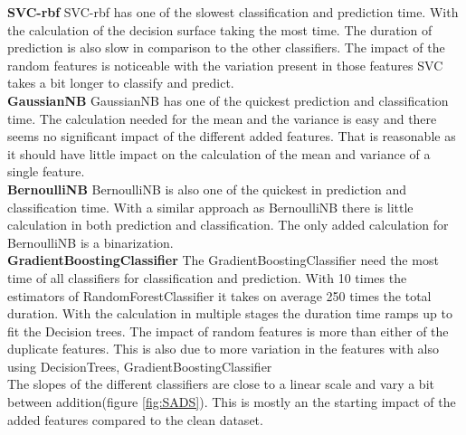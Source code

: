 \documentclass[a4paper,10pt]{article}
\begin{document}
\textbf{SVC-rbf} SVC-rbf has one of the slowest classification and prediction time. With the calculation of the decision surface taking the most time. The duration of prediction is also slow in comparison to the other classifiers. The impact of the random features is noticeable with the variation present in those features SVC takes a bit longer to  classify and predict. \\

\textbf{GaussianNB} GaussianNB has one of the quickest prediction and classification time. The calculation needed for the mean and the variance is easy and there seems no significant impact of the different added features. That is reasonable as it should have little impact on the calculation of the mean and variance of a single feature.\\

\textbf{BernoulliNB} BernoulliNB is also one of the quickest in prediction and classification time. With a similar approach as BernoulliNB there is little calculation in both prediction and classification. The only added calculation for BernoulliNB is a binarization. \\

\textbf{GradientBoostingClassifier} The GradientBoostingClassifier need the most time of all classifiers for classification and prediction. With 10 times the estimators of RandomForestClassifier it takes on average 250 times the total duration. With the calculation in multiple stages the duration time ramps up to fit the Decision trees. The impact of random features is more than either of the duplicate features. This is also due to more variation in the features with also using DecisionTrees, GradientBoostingClassifier %
  \\

The slopes of the different classifiers are close to a linear scale and vary a bit between addition(figure \ref{fig:SADS}). This is mostly an the starting impact of the added features compared to the clean dataset. 
\end{document}
